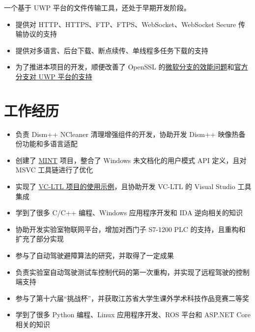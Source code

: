 \documentclass{resume}
\begin{document}
一个基于 UWP 平台的文件传输工具，还处于早期开发阶段。
\begin{itemize}
  \item 提供对 HTTP、HTTPS、FTP、FTPS、WebSocket、WebSocket Secure 传输协议的支持
  \item 提供对多语言、后台下载、断点续传、单线程多任务下载的支持
  \item 为了推进本项目的开发，顺便改善了 OpenSSL 的\href{https://github.com/microsoft/openssl/pull/61}{微软分支的效能问题}和\href{https://github.com/openssl/openssl/blob/42b3f10b5e461496aab1f74d24103d6902ebfcd5/CHANGES#L350}{官方分支对 UWP 平台的支持}
\end{itemize}

\section{工作经历}

\begin{itemize}
  \item 负责 Dism++ NCleaner 清理增强组件的开发，协助开发 Dism++ 映像热备份功能和多语言适配
  \item 创建了 \href{https://github.com/Chuyu-Team/MINT}{MINT} 项目，整合了 Windows 未文档化的用户模式 API 定义，且对 MSVC 工具链进行了优化
  \item 实现了 \href{https://github.com/Chuyu-Team/vc-ltl-samples}{VC-LTL 项目的使用示例}，且协助开发 VC-LTL 的 Visual Studio 工具集成
  \item 学到了很多 C/C++ 编程、Windows 应用程序开发和 IDA 逆向相关的知识
\end{itemize}

\begin{itemize}
  \item 协助开发实验室物联网平台，增加对西门子 S7-1200 PLC 的支持，且重构和扩充了部分实现
  \item 参与了自动驾驶避障算法的研究，并取得了一定成果
  \item 负责实验室自动驾驶测试车控制代码的第一次重构，并实现了远程驾驶的控制端支持
  \item 参与了第十六届“挑战杯”，并获取江苏省大学生课外学术科技作品竞赛二等奖
  \item 学到了很多 Python 编程、Linux 应用程序开发、ROS 平台和 ASP.NET Core 相关的知识
\end{itemize}
\end{document}
